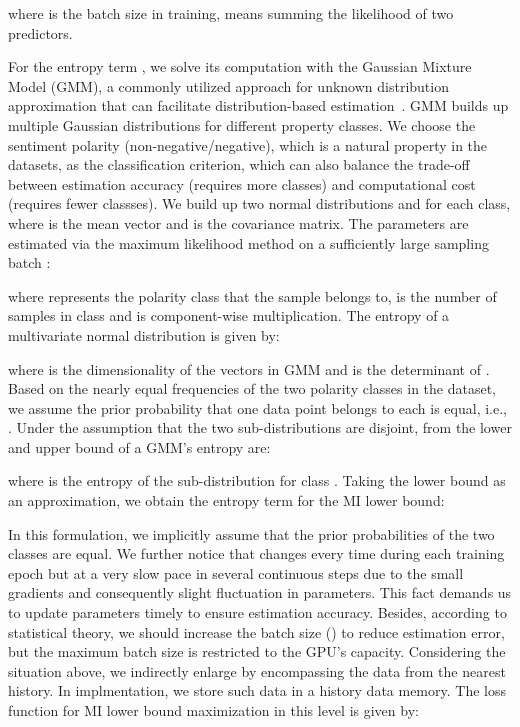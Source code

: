 \documentclass[11pt]{article}
\begin{document}
where  is the batch size in training,  means summing the likelihood of two predictors.

For the entropy term , we solve its computation with the Gaussian Mixture Model (GMM), a commonly utilized approach for unknown distribution approximation that can facilitate distribution-based estimation~\citep{nilsson2002gaussian,kerroum2010textural}.
GMM builds up multiple Gaussian distributions for different property classes.
We choose the sentiment polarity (non-negative/negative), which is a natural property in the datasets, as the classification criterion, which can also balance the trade-off between estimation accuracy (requires more classes) and computational cost (requires fewer classses).
We build up two normal distributions  and  for each class, where  is the mean vector and  is the covariance matrix. 
The parameters are estimated via the maximum likelihood method on a sufficiently large sampling batch :

where  represents the polarity class that the sample belongs to,  is the number of samples in class  and  is component-wise multiplication. 
The entropy of a multivariate normal distribution is given by:

where  is the dimensionality of the vectors in GMM and  is the determinant of .
Based on the nearly equal frequencies of the two polarity classes in the dataset, we assume the prior probability that one data point  belongs to each is equal, i.e., . 
Under the assumption that the two sub-distributions are disjoint, from \citet{huber2008entropy} the lower and upper bound of a GMM's entropy are:

where  is the entropy of the sub-distribution for class .
Taking the lower bound as an approximation, we obtain the entropy term for the MI lower bound:

In this formulation, we implicitly assume that the prior probabilities of the two classes are equal. 
We further notice that  changes every time during each training epoch but at a very slow pace in several continuous steps due to the small gradients and consequently slight fluctuation in parameters.
This fact demands us to update parameters timely to ensure estimation accuracy.
Besides, according to statistical theory, we should increase the batch size () to reduce estimation error, but the maximum batch size is restricted to the GPU's capacity.
Considering the situation above, we indirectly enlarge  by encompassing the data from the nearest history.
In implmentation, we store such data in a history data memory.
The loss function for MI lower bound maximization in this level is given by:
 \label{LBA}
\label{MI1}        
\end{document}
